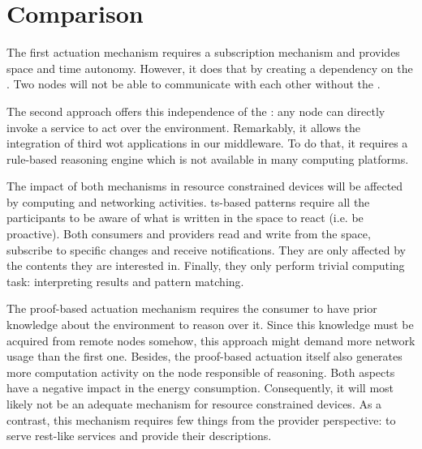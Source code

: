 
\section{Comparison}

The first actuation mechanism requires a subscription mechanism and provides space and time autonomy.
However, it does that by creating a dependency on the \Space{}.
Two nodes will not be able to communicate with each other without the \Space{}.


The second approach offers this independence of the \Space{}: any node can directly invoke a service to act over the environment.
Remarkably, it allows the integration of third \ac{wot} applications in our middleware. %
To do that, it requires a rule-based reasoning engine which is not available in many computing platforms. %





\bigskip

The impact of both mechanisms in resource constrained devices will be affected by computing and networking activities.
\ac{ts}-based patterns require all the participants to be aware of what is written in the space to react (i.e. be proactive).
Both consumers and providers read and write from the space, subscribe to specific changes and receive notifications.
They are only affected by the contents they are interested in.
Finally, they only perform trivial computing task: interpreting results and pattern matching. %


The proof-based actuation mechanism requires the consumer to have prior knowledge about the environment to reason over it. %
Since this knowledge must be acquired from remote nodes somehow, this approach might demand more network usage than the first one.
Besides, the proof-based actuation itself also generates more computation activity on the node responsible of reasoning.
Both aspects have a negative impact in the energy consumption.
Consequently, it will most likely not be an adequate mechanism for resource constrained devices.
As a contrast, this mechanism requires few things from the provider perspective: to serve \ac{rest}-like services and provide their descriptions. %




